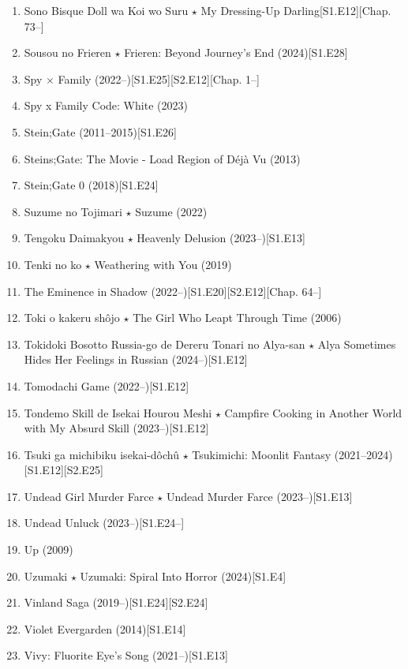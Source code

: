 \documentclass{article}
\begin{document}
\begin{enumerate}
    \item Sono Bisque Doll wa Koi wo Suru $\star$ My Dressing-Up Darling\hfill[S1.E12][Chap. 73--]
    \item {\sc Sousou no Frieren $\star$ Frieren: Beyond Journey's End} (2024)\hfill[S1.E28]
    \item {\sc Spy $\times$ Family} (2022--)\hfill[S1.E25][S2.E12][Chap. 1--]
    \item {\sc Spy x Family Code: White} (2023)
    \item {\sc Stein;Gate} (2011--2015)\hfill[S1.E26]
    \item {\sc Steins;Gate: The Movie - Load Region of Déjà Vu} (2013)
    \item {\sc Stein;Gate 0} (2018)\hfill[S1.E24]
    \item {\sc Suzume no Tojimari $\star$ Suzume} (2022)
    \item Tengoku Daimakyou $\star$ Heavenly Delusion (2023--)\hfill[S1.E13]
    \item {\sc Tenki no ko $\star$ Weathering with You} (2019)
    \item The Eminence in Shadow (2022--)\hfill[S1.E20][S2.E12][Chap. 64--]
    \item {\sc Toki o kakeru sh\^ojo $\star$ The Girl Who Leapt Through Time} (2006)
    \item {\sc Tokidoki Bosotto Russia-go de Dereru Tonari no Alya-san $\star$ Alya Sometimes Hides Her Feelings in Russian} (2024--)\hfill[S1.E12]
    \item {\sc Tomodachi Game} (2022--)\hfill[S1.E12]
    \item Tondemo Skill de Isekai Hourou Meshi $\star$ Campfire Cooking in Another World with My Absurd Skill (2023--)\hfill[S1.E12]
    \item {\sc Tsuki ga michibiku isekai-dôchû $\star$ Tsukimichi: Moonlit Fantasy} (2021--2024)\hfill[S1.E12][S2.E25]
    \item {\sc Undead Girl Murder Farce $\star$ Undead Murder Farce} (2023--)\hfill[S1.E13]
    \item Undead Unluck (2023--)\hfill[S1.E24--]
    \item {\sc Up} (2009)
    \item {\sc Uzumaki $\star$ Uzumaki: Spiral Into Horror} (2024)\hfill[S1.E4]
    \item {\sc Vinland Saga} (2019--)\hfill[S1.E24][S2.E24]
    \item {\sc Violet Evergarden} (2014)\hfill[S1.E14]
    \item {\sc Vivy: Fluorite Eye's Song} (2021--)\hfill[S1.E13]

\end{enumerate}
\end{document}
